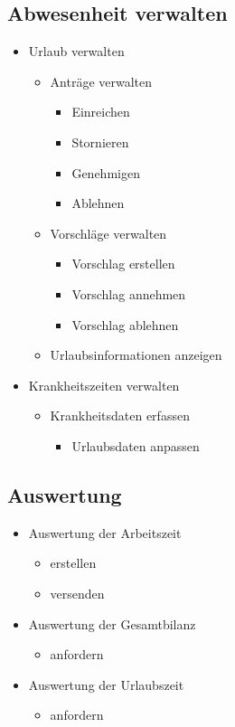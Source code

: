 \subsection*{Abwesenheit verwalten}
\begin{itemize}
\item Urlaub verwalten
\begin{itemize}
\item Anträge verwalten
\begin{itemize}
\item Einreichen
\item Stornieren
\item Genehmigen
\item Ablehnen
\end{itemize}
\item Vorschläge verwalten
\begin{itemize}
\item Vorschlag erstellen
\item Vorschlag annehmen
\item Vorschlag ablehnen
\end{itemize}
\item Urlaubsinformationen anzeigen %
\end{itemize}
\item Krankheitszeiten verwalten
\begin{itemize}
\item Krankheitsdaten erfassen 
\begin{itemize}
\item Urlaubsdaten anpassen
\end{itemize}
\end{itemize}
\end{itemize}
\subsection*{Auswertung}
\begin{itemize}
\item Auswertung der Arbeitszeit
\begin{itemize}
\item erstellen
\item versenden
\end{itemize}
\item Auswertung der Gesamtbilanz
\begin{itemize}
\item anfordern
\end{itemize}
\item Auswertung der Urlaubszeit
\begin{itemize}
\item anfordern
\end{itemize}
\end{itemize}

